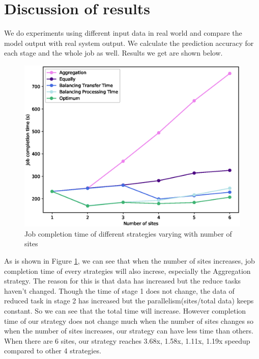 \documentclass[base.tex]{subfiles}
\begin{document}
\section{Discussion of results}
We do experiments using different input data in real world and compare the model output with real system output. We calculate the prediction accuracy for each stage and the whole job as well. Results we get are shown below.
\begin{figure}[htbp]
\centering
\includegraphics[scale=0.5]{sites_time}
\caption{Job completion time of different strategies varying with number of sites}%
\label{number of sites}
\end{figure}
As is shown in Figure \ref{number of sites}, we can see that when the number of sites increases, job completion time of every strategies will also increse, especially the Aggregation strategy. The reason for this is that data has increased but the reduce tasks haven't changed. Though the time of stage 1 does not change, the data of reduced task in stage 2 has increased but the parallelism(sites/total data) keeps constant. So we can see that the total time will increase. However completion time of our strategy does not change much when the number of sites changes so when the number of sites increases, our strategy can have less time than others. When there are 6 sites, our strategy reaches 3.68x, 1.58x, 1.11x, 1.19x speedup compared to other 4 strategies. 
\end{document}
